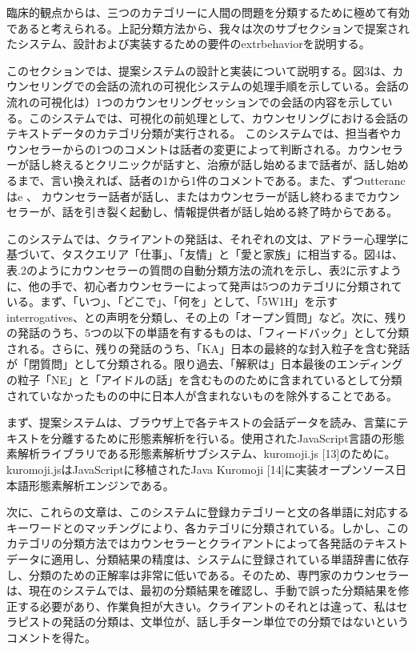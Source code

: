 \documentclass[shuuron]{kuee}
\begin{document}
  臨床的観点からは、三つのカテゴリーに人間の問題を分類するために極めて有効であると考えられる。上記分類方法から、我々は次のサブセクションで提案されたシステム、設計および実装するための要件のextrbehaviorを説明する。


  このセクションでは、提案システムの設計と実装について説明する。図3は、カウンセリングでの会話の流れの可視化システムの処理手順を示している。会話の流れの可視化は）1つのカウンセリングセッションでの会話の内容を示している。このシステムでは、可視化の前処理として、カウンセリングにおける会話のテキストデータのカテゴリ分類が実行される。
  このシステムでは、担当者やカウンセラーからの1つのコメントは話者の変更によって判断される。カウンセラーが話し終えるとクリニックが話すと、治療が話し始めるまで話者が、話し始めるまで、言い換えれば、話者の1から1件のコメントである。また、ずつutterancはe  、 カウンセラー話者が話し、またはカウンセラーが話し終わるまでカウンセラーが、話を引き裂く起動し、情報提供者が話し始める終了時からである。

  このシステムでは、クライアントの発話は、それぞれの文は、アドラー心理学に基づいて、タスクエリア「仕事」、「友情」と「愛と家族」に相当する。図4は、表.2のようにカウンセラーの質問の自動分類方法の流れを示し、表2に示すように、他の手で、初心者カウンセラーによって発声は5つのカテゴリに分類されている。まず、「いつ」、「どこで」、「何を」として、「5W1H」を示すinterrogatives、との声明を分類し、その上の「オープン質問」など。次に、残りの発話のうち、5つの以下の単語を有するものは、「フィードバック」として分類される。さらに、残りの発話のうち、「KA」日本の最終的な封入粒子を含む発話が「閉質問」として分類される。限り過去、「解釈は」日本最後のエンディングの粒子「NE」と「アイドルの話」を含むもののために含まれているとして分類されていなかったものの中に日本人が含まれないものを除外することである。

まず、提案システムは、ブラウザ上で各テキストの会話データを読み、言葉にテキストを分離するために形態素解析を行いる。使用されたJavaScript言語の形態素解析ライブラリである形態素解析サブシステム、kuromoji.js [13]のために。 kuromoji.jsはJavaScriptに移植されたJava Kuromoji [14]に実装オープンソース日本語形態素解析エンジンである。

  次に、これらの文章は、このシステムに登録カテゴリーと文の各単語に対応するキーワードとのマッチングにより、各カテゴリに分類されている。しかし、このカテゴリの分類方法ではカウンセラーとクライアントによって各発話のテキストデータに適用し、分類結果の精度は、システムに登録されている単語辞書に依存し、分類のための正解率は非常に低いである。そのため、専門家のカウンセラーは、現在のシステムでは、最初の分類結果を確認し、手動で誤った分類結果を修正する必要があり、作業負担が大きい。クライアントのそれとは違って、私はセラピストの発話の分類は、文単位が、話し手ターン単位での分類ではないというコメントを得た。
\end{document}
